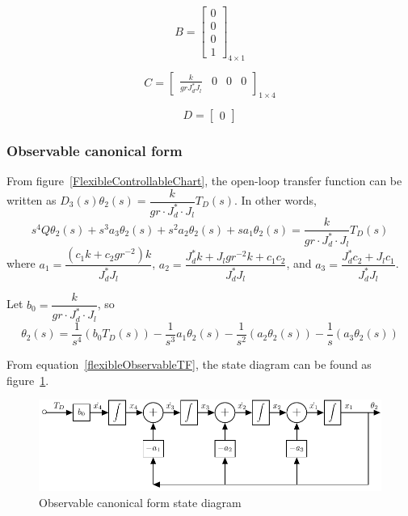 \documentclass[a4paper, 12pt]{article}
\begin{document}
\begin{equation}\label{flexibleControllableB}
B = \begin{bmatrix}
0	\\
0	\\
0	\\
1
\end{bmatrix}_{4\times 1}
\end{equation}

\begin{equation}\label{flexibleControllableC}
C = \begin{bmatrix}
\frac{k}{grJ_d^*J_l}	&	0	&	0	&	0
\end{bmatrix}_{1\times 4}
\end{equation}

\begin{equation}
D = \begin{bmatrix} 0 \end{bmatrix}
\end{equation}

\subsubsection{Observable canonical form}
\hspace{2.5ex}
From figure~\ref{FlexibleControllableChart}, the open-loop transfer function can be written as $D_3(s) \theta_2(s) = \dfrac{k}{gr\cdot J_d^* \cdot J_l} T_D(s)$. In other words, 
\begin{equation}
s^4Q\theta_2(s) + s^3 a_3 \theta_2(s) + s^2 a_2 \theta_2(s) + s a_1 \theta_2(s) = \dfrac{k}{gr\cdot J_d^* \cdot J_l}T_D(s)
\end{equation}
where $a_1 = \dfrac{(c_1 k +c_2 gr^{-2})k}{J_d^* J_l} $, $a_2 = \dfrac{J_d^* k + J_l gr^{-2} k + c_1 c_2}{J_d^* J_l}$, and $a_3 = \dfrac{J_d^*c_2 + J_l c_1}{J_d^*J_l}$.

Let $b_0 = \dfrac{k}{gr\cdot J_d^* \cdot J_l}$, so 
\begin{equation}\label{flexibleObservableTF}
\theta_2(s) = \dfrac{1}{s^4}(b_0 T_D(s)) - \dfrac{1}{s^3} a_1\theta_2(s) - \dfrac{1}{s^2}(a_2 \theta_2(s)) - \dfrac{1}{s}(a_3 \theta_2(s))
\end{equation}

From equation~\ref{flexibleObservableTF}, the state diagram can be found as figure~\ref{ObStateDiag}.

\begin{figure}[!htbp]
\centering
\includegraphics{ObserverStateDiagram}
\caption{Observable canonical form state diagram}
\label{ObStateDiag}
\end{figure}
\end{document}
